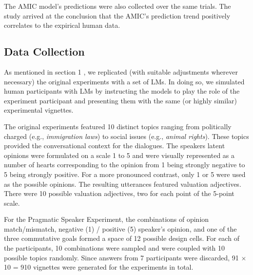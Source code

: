 \documentclass[11pt]{article}
\begin{document}
The AMIC model’s predictions were also collected over the same trials. The study arrived at the conclusion that the AMIC's prediction trend positively correlates to the expirical human data.



\subsection{Data Collection}
\label{sec:data}

As mentioned in section 1 , we replicated (with suitable adjustments wherever necessary) the original experiments with a set of LMs. In doing so, we simulated human participants with LMs by instructing the models to play the role of the experiment participant and presenting them with the same (or highly similar) experimental vignettes.

The original experiments featured 10 distinct topics ranging from politically charged (e.g., \textit{immigration laws}) to social issues (e.g., \textit{animal rights}). These topics provided the conversational context for the dialogues. The speakers latent opinions were formulated on a scale 1 to 5 and were visually represented as a number of hearts corresponding to the opinion from 1 being strongly negative to 5 being strongly positive. For a more pronounced contrast, only 1 or 5 were used as the possible opinions. The resulting utterances featured valuation adjectives. There were 10 possible valuation adjectives, two for each point of the 5-point scale.

For the Pragmatic Speaker Experiment, the combinations of opinion match/mismatch, negative (1) / positive (5) speaker's opinion, and one of the three commutative goals formed a space of 12 possible design cells. For each of the participants, 10 combinations were sampled and were coupled with 10 possible topics randomly. Since answers from 7 participants were discarded, 91 $\times$ 10 = 910 vignettes were generated for the experiments in total.
\end{document}
